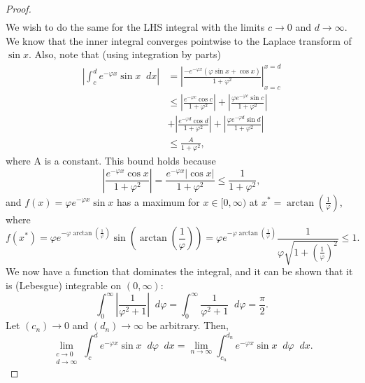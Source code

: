 \documentclass[a4paper]{article}
\newcommand*\diff{\mathop{}\!d} %
\theoremstyle{definition}
\begin{document}
\begin{proof}
\begin{align*}
    \end{align*}
    We wish to do the same for the LHS integral with the limits $c \to 0$ and $d \to \infty$.
    We know that the inner integral converges pointwise to the Laplace transform of $\sin x$.
    Also, note that (using integration by parts)
    \begin{align*}
        \left|\int_{c}^{d} e^{-\varphi x} \sin x \diff x \right| & = \left| \frac{-e^{-\varphi x} (\varphi\sin x + \cos x)}{1+\varphi^2} \right|_{x= c}^{x = d}                                  \\
                                                                 & \leq \left|\frac{e^{-\varphi c} \cos c}{1+\varphi^2}\right| + \left|\frac{\varphi e^{ -\varphi c} \sin c}{1+\varphi^2}\right| \\
                                                                 & + \left|\frac{e^{-\varphi d} \cos d}{1+\varphi^2}\right| + \left|\frac{\varphi e^{-\varphi d} \sin d}{1+\varphi^2}\right|     \\
                                                                 & \leq \frac{A}{1+\varphi^2},
    \end{align*}
    where A is a constant.
    This bound holds because
    \begin{equation*}
        \left| \frac{e^{-\varphi x} \cos x}{1+\varphi^2}\right| = \frac{e^{-\varphi x}|\cos x|}{1 +\varphi^2} \leq \frac{1}{1+\varphi^2},
    \end{equation*}
    and $f(x) = \varphi e^{-\varphi x} \sin x$ has a maximum for $x \in [0,\infty)$ at $x^* = \arctan \left(\frac{1}{\varphi}\right)$, where
    \begin{equation*}
        f(x^*) = \varphi e^{-\varphi \arctan\left(\frac{1}{\varphi}\right)} \sin \left(\arctan\left(\frac{1}{\varphi}\right)\right) = \varphi e^{-\varphi \arctan\left(\frac{1}{\varphi}\right)}\frac {1}{\varphi \sqrt{1 + \left(\frac{1}{\varphi}\right)^2}} \leq 1.
    \end{equation*}
    We now have a function that dominates the integral, and it can be shown that it is (Lebesgue) integrable on $(0, \infty)$:
    \begin{equation*}
        \int_{0}^{\infty} \left|\frac{1}{\varphi^2 + 1}\right| \diff \varphi = \int_{0}^{\infty} \frac{1}{\varphi^2 + 1} \diff \varphi = \frac{\pi}{2}.
    \end{equation*}
    Let $(c_n) \to 0$ and $(d_n) \to \infty$ be arbitrary.
    Then,
    \begin{equation*}
        \lim_{\substack{c \to 0 \\ d\to \infty}} \int_{c}^{d} e^{-\varphi x} \sin x  \diff \varphi \diff x = \lim_{n \to \infty}  \int_{c_n}^{d_n} e^{-\varphi x} \sin x  \diff \varphi \diff x.

\end{equation*}
\end{proof}
\end{document}
